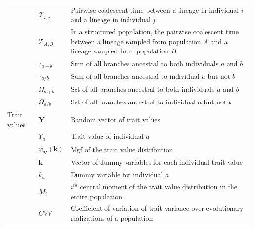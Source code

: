 \begin{table}
\begin{tabular}{l l l}
                             & $\mathcal{T}_{i,j}$ & \multicolumn{1}{p{10cm}}{Pairwise coalescent time between a lineage in individual $i$ and a lineage in individual $j$}\\
                             & $\mathcal{T}_{A,B}$ & \multicolumn{1}{p{10cm}}{In a structured population, the pairwise coalescent time between a lineage sampled from population $A$ and a lineage sampled from population $B$}\\
                             & $\tau_{a+b}$ & \multicolumn{1}{p{10cm}}{Sum of all branches ancestral to both individuals $a$ and $b$}\\
                             & $\tau_{a/b}$ & \multicolumn{1}{p{10cm}}{Sum of all branches ancestral to individual $a$ but not $b$}\\
                             & $\Omega_{a+b}$ & \multicolumn{1}{p{10cm}}{Set of all branches ancestral to both individuals $a$ and $b$}\\
                             & $\Omega_{a/b}$ & \multicolumn{1}{p{10cm}}{Set of all branches ancestral to individual $a$ but not $b$}\\                           
    Trait values & $\mathbf{Y}$ & Random vector of trait values \\
                             & $Y_a$ & Trait value of individual $a$\\
                             & $\varphi_{\mathbf{Y}}(\mathbf{k})$ & Mgf of the trait value distribution \\
                             & $\mathbf{k}$ & \multicolumn{1}{p{10cm}}{Vector of dummy variables for each individual trait value}\\
                             & $k_a$ & Dummy variable for individual $a$\\
                             & $M_i$ & \multicolumn{1}{p{10cm}}{$i^{th}$ central moment of the trait value distribution in the entire population}\\
                             & $CVV$ & \multicolumn{1}{p{10cm}}{Coefficient of variation of trait variance over evolutionary realizations of a population}\\
                                       \hline
  \end{tabular}
\end{table}

